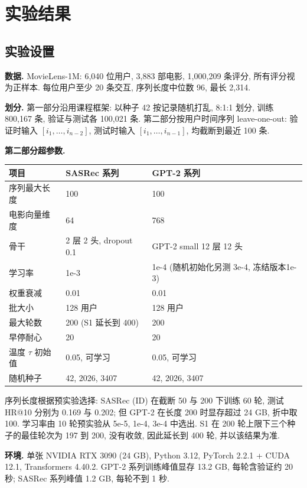 \documentclass{article}
\begin{document}
\section{实验结果}

\subsection{实验设置}

\textbf{数据.} MovieLens-1M: 6,040 位用户, 3,883 部电影, 1,000,209 条评分, 所有评分视为正样本. 每位用户至少 20 条交互, 序列长度中位数 96, 最长 2,314.

\textbf{划分.} 第一部分沿用课程框架: 以种子 42 按记录随机打乱, 8:1:1 划分, 训练 800,167 条, 验证与测试各 100,021 条. 第二部分按用户时间序列 leave-one-out: 验证时输入 $[i_1,\ldots,i_{n-2}]$, 测试时输入 $[i_1,\ldots,i_{n-1}]$, 均截断到最近 100 条.

\textbf{第二部分超参数.}

\begin{center}
\small
\begin{tabular}{lll}
\toprule
项目 & SASRec 系列 & GPT-2 系列 \\
\midrule
序列最大长度 & 100 & 100 \\
电影向量维度 & 64 & 768 \\
骨干 & 2 层 2 头, dropout 0.1 & GPT-2 small 12 层 12 头 \\
学习率 & 1e-3 & 1e-4 (随机初始化另测 3e-4, 冻结版本1e-3) \\
权重衰减 & 0.01 & 0.01 \\
批大小 & 128 用户 & 128 用户 \\
最大轮数 & 200 (S1 延长到 400) & 200 \\
早停耐心 & 20 & 20 \\
温度 $\tau$ 初始值 & 0.05, 可学习 & 0.05, 可学习 \\
随机种子 & 42, 2026, 3407 & 42, 2026, 3407 \\
\bottomrule
\end{tabular}
\end{center}

序列长度根据预实验选择: SASRec (ID) 在截断 50 与 200 下训练 60 轮, 测试 HR@10 分别为 0.169 与 0.202; 但 GPT-2 在长度 200 时显存超过 24 GB, 折中取 100. 学习率由 10 轮预实验从 5e-5, 1e-4, 3e-4 中选出. S1 在 200 轮上限下三个种子的最佳轮次为 197 到 200, 没有收敛, 因此延长到 400 轮, 并以该结果为准.

\textbf{环境.} 单张 NVIDIA RTX 3090 (24 GB), Python 3.12, PyTorch 2.2.1 + CUDA 12.1, Transformers 4.40.2. GPT-2 系列训练峰值显存 13.2 GB, 每轮含验证约 20 秒; SASRec 系列峰值 1.2 GB, 每轮不到 1 秒.
\end{document}
